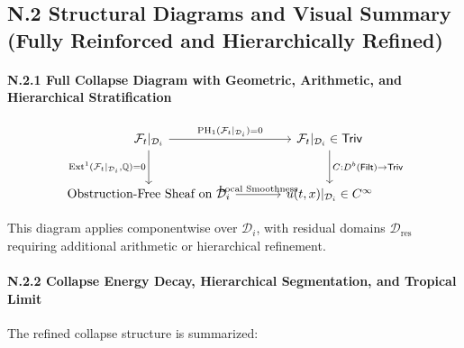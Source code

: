 \documentclass[11pt]{article}
\begin{document}
\subsection*{N.2 Structural Diagrams and Visual Summary (Fully Reinforced and Hierarchically Refined)}

\paragraph{N.2.1 Full Collapse Diagram with Geometric, Arithmetic, and Hierarchical Stratification}

\[
\begin{tikzcd}[row sep=large, column sep=large]
\mathcal{F}_t|_{\mathcal{D}_i}
  \arrow[r, "{\mathrm{PH}_1(\mathcal{F}_t|_{\mathcal{D}_i}) = 0}"]
  \arrow[d, "{\mathrm{Ext}^1(\mathcal{F}_t|_{\mathcal{D}_i}, \mathbb{Q}) = 0}"']
& \mathcal{F}_t|_{\mathcal{D}_i} \in \mathsf{Triv}
  \arrow[d, "{C : D^b(\mathsf{Filt}) \to \mathsf{Triv}}"] \\
\text{Obstruction-Free Sheaf on } \mathcal{D}_i
  \arrow[r, "{\text{Local Smoothness}}"]
& u(t, x)|_{\mathcal{D}_i} \in C^\infty
\end{tikzcd}
\]

This diagram applies componentwise over $\mathcal{D}_i$, with residual domains $\mathcal{D}_{\mathrm{res}}$ requiring additional arithmetic or hierarchical refinement.

\paragraph{N.2.2 Collapse Energy Decay, Hierarchical Segmentation, and Tropical Limit}

The refined collapse structure is summarized:

\begin{center}
\end{center}
\end{document}
